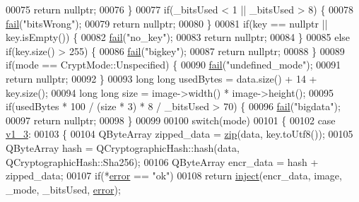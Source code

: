 \begin{DoxyCode}
00075         \textcolor{keywordflow}{return} \textcolor{keyword}{nullptr};
00076     \}
00077     \textcolor{keywordflow}{if}(\_bitsUsed < 1 || \_bitsUsed > 8) \{
00078         \hyperlink{class_model_p_c_a47464b59b7e37fcee25e55475708aabd}{fail}(\textcolor{stringliteral}{"bitsWrong"});
00079         \textcolor{keywordflow}{return} \textcolor{keyword}{nullptr};
00080     \}
00081     \textcolor{keywordflow}{if}(key == \textcolor{keyword}{nullptr} || key.isEmpty()) \{
00082         \hyperlink{class_model_p_c_a47464b59b7e37fcee25e55475708aabd}{fail}(\textcolor{stringliteral}{"no\_key"});
00083         \textcolor{keywordflow}{return} \textcolor{keyword}{nullptr};
00084     \}
00085     \textcolor{keywordflow}{else} \textcolor{keywordflow}{if}(key.size() > 255) \{
00086         \hyperlink{class_model_p_c_a47464b59b7e37fcee25e55475708aabd}{fail}(\textcolor{stringliteral}{"bigkey"});
00087         \textcolor{keywordflow}{return} \textcolor{keyword}{nullptr};
00088     \}
00089     \textcolor{keywordflow}{if}(mode == CryptMode::Unspecified) \{
00090         \hyperlink{class_model_p_c_a47464b59b7e37fcee25e55475708aabd}{fail}(\textcolor{stringliteral}{"undefined\_mode"});
00091         \textcolor{keywordflow}{return} \textcolor{keyword}{nullptr};
00092     \}
00093     \textcolor{keywordtype}{long} \textcolor{keywordtype}{long} usedBytes = data.size() + 14 + key.size();
00094     \textcolor{keywordtype}{long} \textcolor{keywordtype}{long} size = image->width() * image->height();
00095     \textcolor{keywordflow}{if}(usedBytes * 100 / (size * 3) * 8 / \_bitsUsed > 70) \{
00096         \hyperlink{class_model_p_c_a47464b59b7e37fcee25e55475708aabd}{fail}(\textcolor{stringliteral}{"bigdata"});
00097         \textcolor{keywordflow}{return} \textcolor{keyword}{nullptr};
00098     \}
00099 
00100     \textcolor{keywordflow}{switch}(mode)
00101     \{
00102         \textcolor{keywordflow}{case} \hyperlink{class_model_p_c_a296dd7afe3e1c49b3da25fd644fe4ceba7612e38de7178170655a56ddcf96e12c}{v1\_3}:
00103         \{
00104             QByteArray zipped\_data = \hyperlink{class_model_p_c_afebbbfa4b07deba4f68fc6dfb50f353f}{zip}(data, key.toUtf8());
00105             QByteArray hash = QCryptographicHash::hash(data, QCryptographicHash::Sha256);
00106             QByteArray encr\_data = hash + zipped\_data;
00107             \textcolor{keywordflow}{if}(*\hyperlink{class_model_p_c_a4e5a9c0ca1f06fe5bc478b6bf248c37c}{error} == \textcolor{stringliteral}{"ok"})
00108                 \textcolor{keywordflow}{return} \hyperlink{class_model_p_c_aada6a04d81ada8f2b4ba18108c8d6f10}{inject}(encr\_data, image, \_mode, \_bitsUsed, \hyperlink{class_model_p_c_a4e5a9c0ca1f06fe5bc478b6bf248c37c}{error});

\end{DoxyCode}
